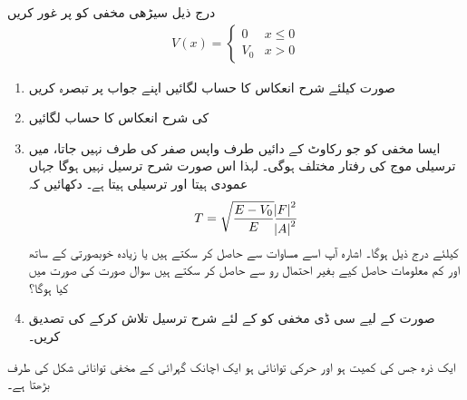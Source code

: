  درج ذیل سیڑھی مخفی کو پر غور کریں
\begin{align}
V(x)=
\begin{cases}
0 & x\le 0\\
V_{0}&x> 0
\end{cases}
\end{align}

\begin{enumerate}
\item  صورت  کیلئے شرح انعکاس کا حساب لگائیں اپنے جواب پر تبصرہ کریں 
\item
{} کی شرح انعکاس کا حساب لگائیں  
\item
ایسا مخفی کو جو رکاوٹ کے دائیں طرف واپس صفر کی طرف نہیں جاتا، میں ترسیلی موج کی رفتار مختلف ہوگی۔  لہذا اس صورت شرح ترسیل  نہیں ہوگا جہاں   عمودی ہیتا  اور ترسیلی ہیتا ہے۔ دکھائیں  کہ\begin{align} T=\sqrt{\frac{E-V_{0}}{E}  }\frac{\abs{F}^{2}}{\abs{A}^{2}} \end{align}
کیلئے درج ذیل ہوگا۔
 اشارہ آپ اسے مساوات سے حاصل کر سکتے ہیں یا زیادہ خوبصورتی کے ساتھ اور کم معلومات حاصل کیے بغیر احتمال رو سے حاصل کر سکتے ہیں سوال صورت کی صورت میں   کیا ہوگا؟
\item

صورت  کے لیے سی ڈی مخفی کو کے لئے شرح ترسیل تلاش کرکے  کی تصدیق کریں۔
\end{enumerate}
ایک ذرہ جس کی کمیت  ہو اور حرکی توانائی  ہو ایک اچانک گہرائی کے مخفی توانائی شکل کی طرف بڑھتا ہے۔ 


